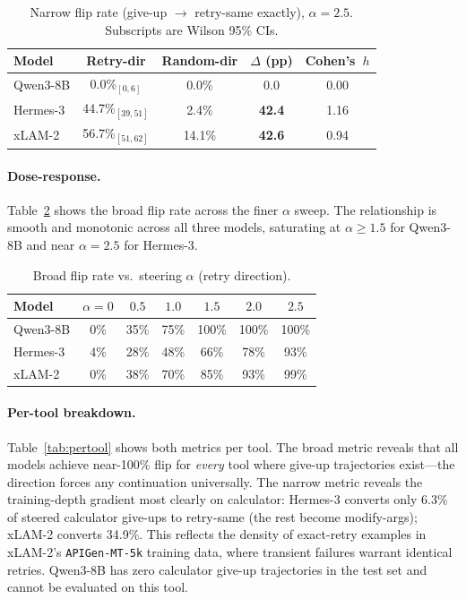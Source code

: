 \documentclass{article}
\begin{document}
\begin{table}[t]
\caption{Narrow flip rate (give-up $\to$ retry-same exactly),
$\alpha{=}2.5$. Subscripts are Wilson 95\% CIs.}
\label{tab:narrow}
\centering\small
\begin{tabular}{lcccc}
\toprule
Model & Retry-dir & Random-dir & $\Delta$ (pp) & Cohen's~$h$ \\
\midrule
Qwen3-8B & 0.0\%$_{\scriptscriptstyle[0,6]}$    & 0.0\%  & 0.0   & 0.00 \\
Hermes-3 & 44.7\%$_{\scriptscriptstyle[39,51]}$ & 2.4\%  & \textbf{42.4} & 1.16 \\
xLAM-2   & 56.7\%$_{\scriptscriptstyle[51,62]}$ & 14.1\% & \textbf{42.6} & 0.94 \\
\bottomrule
\end{tabular}
\end{table}

\paragraph{Dose-response.}
Table~\ref{tab:dose} shows the broad flip rate across the finer $\alpha$ sweep.
The relationship is smooth and monotonic across all three models, saturating
at $\alpha \geq 1.5$ for Qwen3-8B and near $\alpha = 2.5$ for Hermes-3.

\begin{table}[t]
\caption{Broad flip rate vs.\ steering $\alpha$ (retry direction).}
\label{tab:dose}
\centering\small
\begin{tabular}{lcccccc}
\toprule
Model & $\alpha{=}0$ & $0.5$ & $1.0$ & $1.5$ & $2.0$ & $2.5$ \\
\midrule
Qwen3-8B &  0\% & 35\% & 75\% & 100\% & 100\% & 100\% \\
Hermes-3 &  4\% & 28\% & 48\% &  66\% &  78\% &  93\% \\
xLAM-2   &  0\% & 38\% & 70\% &  85\% &  93\% &  99\% \\
\bottomrule
\end{tabular}
\end{table}

\paragraph{Per-tool breakdown.}
Table~\ref{tab:pertool} shows both metrics per tool.
The broad metric reveals that all models achieve near-100\% flip for
\emph{every} tool where give-up trajectories exist---the direction
forces any continuation universally.
The narrow metric reveals the training-depth gradient most clearly
on calculator: Hermes-3 converts only 6.3\% of steered calculator
give-ups to retry-same (the rest become modify-args); xLAM-2 converts
34.9\%.
This reflects the density of exact-retry examples in xLAM-2's
\texttt{APIGen-MT-5k} training data, where transient failures
warrant identical retries.
Qwen3-8B has zero calculator give-up trajectories in the test set
and cannot be evaluated on this tool.
\end{document}
